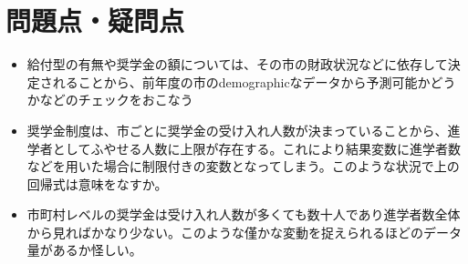 \documentclass{jsarticle}
\begin{document}
\section{問題点・疑問点}
\begin{itemize}
\item 給付型の有無や奨学金の額については、その市の財政状況などに依存して決定されることから、前年度の市のdemographicなデータから予測可能かどうかなどのチェックをおこなう
\item 奨学金制度は、市ごとに奨学金の受け入れ人数が決まっていることから、進学者としてふやせる人数に上限が存在する。これにより結果変数に進学者数などを用いた場合に制限付きの変数となってしまう。このような状況で上の回帰式は意味をなすか。
\item 市町村レベルの奨学金は受け入れ人数が多くても数十人であり進学者数全体から見ればかなり少ない。このような僅かな変動を捉えられるほどのデータ量があるか怪しい。
\end{itemize}
\end{document}
